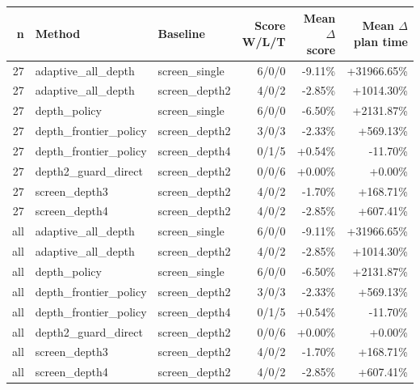 \begin{tabular}{rllrrr}
\toprule
n & Method & Baseline & Score W/L/T & Mean $\Delta$ score & Mean $\Delta$ plan time \\
\midrule
27 & adaptive\_all\_depth & screen\_single & 6/0/0 & -9.11\% & +31966.65\% \\
27 & adaptive\_all\_depth & screen\_depth2 & 4/0/2 & -2.85\% & +1014.30\% \\
27 & depth\_policy & screen\_single & 6/0/0 & -6.50\% & +2131.87\% \\
27 & depth\_frontier\_policy & screen\_depth2 & 3/0/3 & -2.33\% & +569.13\% \\
27 & depth\_frontier\_policy & screen\_depth4 & 0/1/5 & +0.54\% & -11.70\% \\
27 & depth2\_guard\_direct & screen\_depth2 & 0/0/6 & +0.00\% & +0.00\% \\
27 & screen\_depth3 & screen\_depth2 & 4/0/2 & -1.70\% & +168.71\% \\
27 & screen\_depth4 & screen\_depth2 & 4/0/2 & -2.85\% & +607.41\% \\
all & adaptive\_all\_depth & screen\_single & 6/0/0 & -9.11\% & +31966.65\% \\
all & adaptive\_all\_depth & screen\_depth2 & 4/0/2 & -2.85\% & +1014.30\% \\
all & depth\_policy & screen\_single & 6/0/0 & -6.50\% & +2131.87\% \\
all & depth\_frontier\_policy & screen\_depth2 & 3/0/3 & -2.33\% & +569.13\% \\
all & depth\_frontier\_policy & screen\_depth4 & 0/1/5 & +0.54\% & -11.70\% \\
all & depth2\_guard\_direct & screen\_depth2 & 0/0/6 & +0.00\% & +0.00\% \\
all & screen\_depth3 & screen\_depth2 & 4/0/2 & -1.70\% & +168.71\% \\
all & screen\_depth4 & screen\_depth2 & 4/0/2 & -2.85\% & +607.41\% \\
\bottomrule
\end{tabular}
